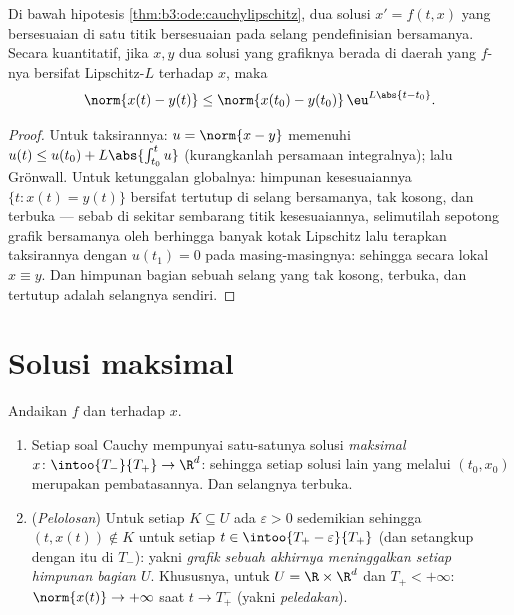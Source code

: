 \begin{corollary}
\label{cor:b3:ode:uniqueness}
Di bawah hipotesis \cref{thm:b3:ode:cauchylipschitz},
dua solusi $x' = f(t,x)$ yang bersesuaian di satu titik bersesuaian
pada selang pendefinisian bersamanya. Secara kuantitatif, jika
$x, y$ dua solusi yang grafiknya berada di daerah yang $f$-nya bersifat
Lipschitz-$L$ terhadap $x$, maka
\[
\norm{x(t) - y(t)} \leq \norm{x(t_0) -
y(t_0)}\,\eu^{L\abs{t - t_0}} .
\]
\end{corollary}

\begin{proof}
Untuk taksirannya: $u = \norm{x - y}$ memenuhi $u(t) \leq u(t_0)
+ L\abs{\int_{t_0}^tu}$ (kurangkanlah persamaan integralnya);
lalu Grönwall. Untuk ketunggalan globalnya: himpunan kesesuaiannya $\{t : x(t)
= y(t)\}$ bersifat tertutup di selang bersamanya, tak kosong, dan
terbuka --- sebab di sekitar sembarang titik kesesuaiannya, selimutilah sepotong 
grafik bersamanya oleh berhingga banyak kotak Lipschitz lalu terapkan
taksirannya dengan $u(t_1) = 0$ pada masing-masingnya: sehingga secara lokal $x \equiv y$.
Dan himpunan bagian sebuah selang yang tak kosong, terbuka, dan tertutup adalah selangnya sendiri.
\end{proof}

\section{Solusi maksimal}

\begin{theorem}
\label{thm:b3:ode:maximal}
Andaikan $f$  dan  terhadap $x$.
\begin{enumerate}
  \item Setiap soal Cauchy mempunyai satu-satunya solusi
        \emph{maksimal} $x \colon \intoo{T_-}{T_+} \to \R^d$: sehingga setiap
        solusi lain yang melalui $(t_0, x_0)$ merupakan
        pembatasannya. Dan selangnya terbuka.
  \item (\emph{Pelolosan}) Untuk setiap  $K \subseteq U$
        ada $\varepsilon > 0$ sedemikian sehingga $(t, x(t)) \notin
        K$ untuk setiap $t \in \intoo{T_+ - \varepsilon}{T_+}$ (dan
        setangkup dengan itu di $T_-$): yakni \emph{grafik sebuah  akhirnya meninggalkan setiap himpunan bagian 
        $U$}. Khususnya,
        untuk $U = \R\times\R^d$ dan $T_+ < +\infty$:
        $\norm{x(t)} \to +\infty$ saat $t \to T_+^-$
        (yakni \emph{peledakan}).
\end{enumerate}
\end{theorem}

